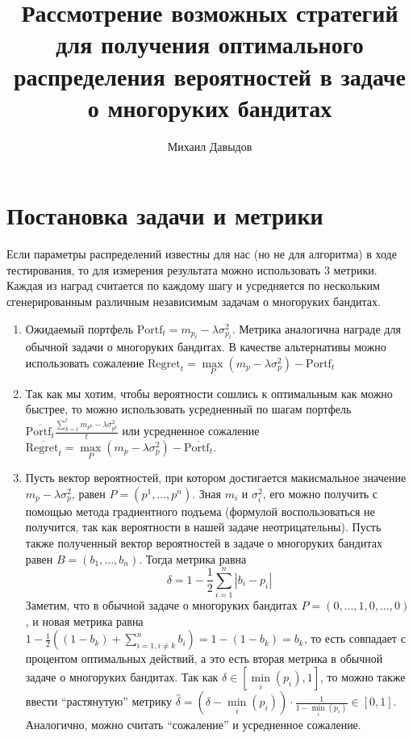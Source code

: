 \documentclass{article}
\title{Рассмотрение возможных стратегий для получения оптимального распределения вероятностей в задаче о многоруких бандитах}
\author{Михаил Давыдов}
\begin{document}
\maketitle

\section{Постановка задачи и метрики}

Если параметры распределений известны для нас (но не для алгоритма) в ходе тестирования, то для измерения результата можно использовать 3 метрики. Каждая из наград считается по каждому шагу и усредняется по нескольким сгенерированным различным независимым задачам о многоруких бандитах.
\begin{enumerate}
    \item Ожидаемый портфель $\text{Portf}_t = m_{p_t} - \lambda \sigma_{p_t}^2$. Метрика аналогична награде для обычной задачи о многоруких бандитах. В качестве альтернативы можно использовать сожаление $\text{Regret}_t = \underset{P}{\max} \left( m_p - \lambda \sigma_p^2 \right) - \text{Portf}_t$
    \item Так как мы хотим, чтобы вероятности сошлись к оптимальным как можно быстрее, то можно использовать усредненный по шагам портфель $\overline{\text{Portf}_t} \frac{\sum_{k=1}^t m_{p^k} - \lambda \sigma_{p^k}^2}{t}$ или усредненное сожаление $\overline{\text{Regret}_t} = \underset{P}{\max} \left( m_p - \lambda \sigma_p^2 \right) - \overline{\text{Portf}_t}$.
    \item Пусть вектор вероятностей, при котором достигается макисмальное значение $m_p - \lambda \sigma_p^2$, равен $P = (p^1, ..., p^n)$. Зная $m_i$ и $\sigma_i^2$, его можно получить с помощью метода градиентного подъема (формулой воспользоваться не получится, так как вероятности в нашей задаче неотрицательны). Пусть также полученный вектор вероятностей в задаче о многоруких бандитах равен $B = (b_1, ..., b_n)$. Тогда метрика равна $$\delta = 1 - \frac{1}{2}\sum_{i=1}^n |b_i - p_i|$$
    Заметим, что в обычной задаче о многоруких бандитах $P = (0, ..., 1, 0, ..., 0)$, и новая метрика равна $1 - \frac{1}{2}\left( (1 - b_k) + \sum_{i = 1, i \neq k}^n b_i \right) = 1 - (1 - b_k) = b_k$, то есть совпадает с процентом оптимальных действий, а это есть вторая метрика в обычной задаче о многоруких бандитах. Так как $\delta \in [\underset{i}{\min} (p_i), 1]$, то можно также ввести ``растянутую'' метрику $\hat{\delta} = (\delta - \underset{i}{\min}(p_i) ) \cdot \frac{1}{1 - \underset{i}{\min}(p_i)} \in [0,1]$. Аналогично, можно считать ``сожаление'' и усредненное сожаление.
\end{enumerate}
\end{document}
